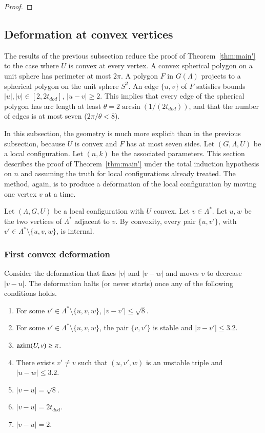 \documentclass{article} %
\begin{document}
\begin{proof}
\end{proof}

\subsection{Deformation at convex vertices}

The results of the previous subsection
reduce the proof of Theorem~\ref{thm:main'} to
the case where $U$ is convex at every vertex.  A convex
spherical polygon on a unit sphere has perimeter
at most $2\pi$.  A polygon $F$ in $G(\Lambda)$ projects to
a spherical polygon on the unit sphere $S^2$.  An edge $\{u,v\}$ of
$F$ satisfies bounds $|u|,|v|\in[2,2t_{dod}]$, $|u-v|\ge 2$. This
implies that every edge of the spherical polygon has arc length
at least $\theta=2\arcsin(1/(2t_{dod}))$, and that the number
of edges is at most seven ($2\pi/\theta < 8$).

In this subsection, the geometry is much more explicit than in the
previous subsection, because $U$ is convex and $F$ has at most seven sides.
Let $(G,\Lambda,U)$ be a local configuration.
Let $(n,k)$ be the associated parameters.
This section describes the proof of Theorem~\ref{thm:main'} under 
the total induction hypothesis on $n$ and assuming the truth
for local configurations already treated.
The method, again, is to produce a deformation of the local
configuration by moving one vertex $v$ at a time.



Let $(\Lambda,G,U)$ be a local configuration with $U$ convex.
Let $v\in\Lambda^*$.  
Let $u,w$ be the two vertices of $\Lambda^*$
adjacent to $v$.  By convexity, every pair $\{u,v'\}$,
with $v'\in\Lambda^*\setminus\{u,v,w\}$, is internal.


\subsubsection{First convex deformation}

Consider the deformation that fixes $|v|$ and $|v-w|$ and
moves $v$ to decrease $|v-u|$.  
The deformation halts (or never starts) once any
of the following conditions holds.
\begin{enumerate}\label{e:halt-convex}
\item For some $v'\in\Lambda^*\setminus\{u,v,w\}$, 
$|v-v'|\le \sqrt8$.
\item For some $v'\in\Lambda^*\setminus\{u,v,w\}$,
the pair $\{v,v'\}$ is  stable and $|v-v'|\le 3.2$.
\item ${\operatorname{azim}}(U,v)\ge\pi$.
\item There exists $v'\ne v$ such that 
$(u,v',w)$ is an unstable triple and $|u-w|\le3.2$.
\item $|v-u|=\sqrt8$.
\item $|v-u|=2t_{dod}$.
\item $|v-u|=2$.
\end{enumerate}
\end{document}
